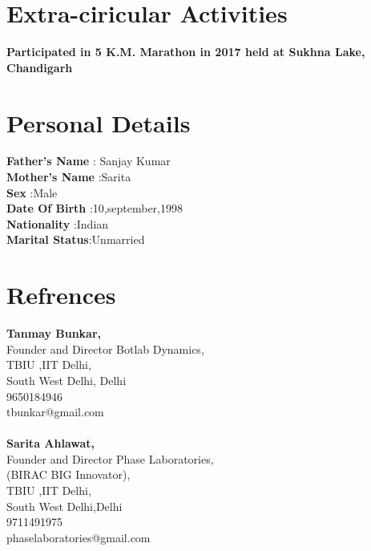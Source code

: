 \documentclass[11pt]{article}
\begin{document}
\section{Extra-ciricular Activities}
\textbf{ Participated in 5 K.M. Marathon in 2017 held at Sukhna Lake, Chandigarh}

\section{Personal Details}
\textbf{Father's Name} : Sanjay Kumar\\
\textbf{Mother's Name} :Sarita \\
\textbf{Sex}           :Male\\
\textbf{Date Of Birth} :10,september,1998\\
\textbf{Nationality}   :Indian\\
\textbf{Marital Status}:Unmarried\\

\section{Refrences}
\textbf{Tanmay Bunkar,}\\
Founder and Director Botlab Dynamics,\\
TBIU ,IIT Delhi,\\
South West Delhi, Delhi\\
9650184946\\
tbunkar@gmail.com\\\\
\textbf{Sarita Ahlawat,}\\
Founder and Director Phase Laboratories,\\
(BIRAC BIG Innovator),\\
TBIU ,IIT Delhi,\\
South West Delhi,Delhi\\
9711491975\\
phaselaboratories@gmail.com\\
\end{document}

